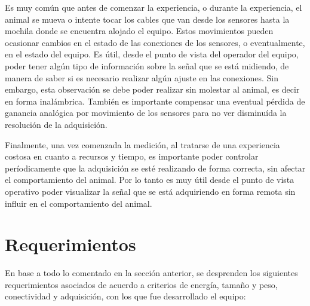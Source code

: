 Es muy común que antes de comenzar la experiencia, o durante la experiencia, el animal se mueva o intente tocar los cables que van desde los sensores hasta la mochila donde se encuentra alojado el equipo. Estos movimientos pueden ocasionar cambios en el estado de las conexiones de los sensores, o eventualmente, en el estado del equipo. Es útil, desde el punto de vista del operador del equipo, poder tener algún tipo de información sobre la señal que se está midiendo, de manera de saber si es necesario realizar algún ajuste en las conexiones. Sin embargo, esta observación se debe poder realizar sin molestar al animal, es decir en forma inalámbrica. También es importante compensar una eventual pérdida de ganancia analógica por movimiento de los sensores para no ver disminuída la resolución de la adquisición. 

Finalmente, una vez comenzada la medición, al tratarse de una experiencia costosa en cuanto a recursos y tiempo, es importante poder controlar períodicamente que la adquisición se esté realizando de forma correcta, sin afectar el comportamiento del animal. Por lo tanto es muy útil desde el punto de vista operativo poder visualizar la señal que se está adquiriendo en forma remota sin influir en el comportamiento del animal.


\section{Requerimientos} \label{requerimientos}

En base a todo lo comentado en la sección anterior, se desprenden los siguientes requerimientos asociados de acuerdo a criterios de energía, tamaño y peso, conectividad y adquisición, con los que fue desarrollado el equipo:


